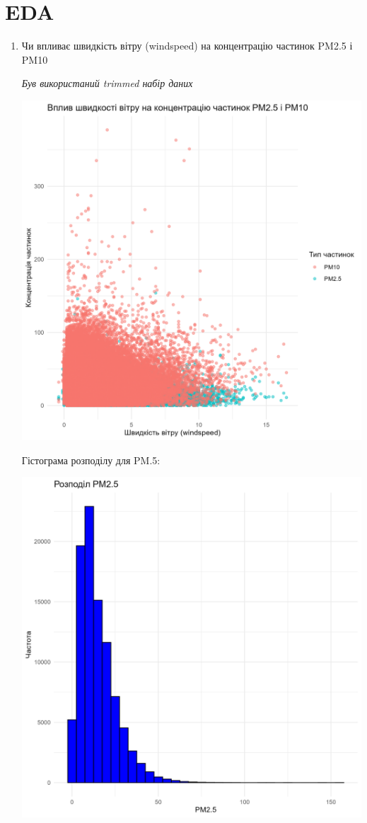 \documentclass[./report.tex]{subfiles}
\begin{document}
\section{EDA}

\begin{enumerate}
    \item Чи впливає швидкість вітру (windspeed) на концентрацію частинок PM2.5 і PM10
    
    \quad \textit{Був використаний trimmed набір даних}

    \includegraphics[width=6in]{plots/question1/wind_speed_vs_pm.png}

    Гістограма розподілу для PM.5:
    
    \includegraphics[width=6in]{plots/question1/pm2_5_gist.png}


\end{enumerate}
\end{document}
